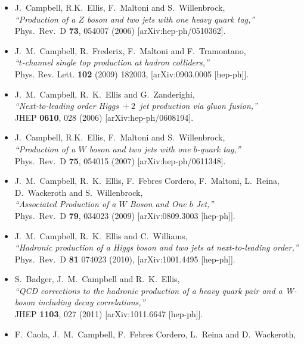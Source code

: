 \documentclass[12pt]{article}
\begin{document}
\begin{itemize}
{  decay,''} \\
  Nucl.\ Phys.\ B {\bf 726}, 109 (2005)
  [arXiv:hep-ph/0506289].
\item J.~Campbell, R.K.~Ellis, F.~Maltoni and S.~Willenbrock, \\
  {\it ``Production of a $Z$ boson and two jets with one heavy quark tag,''} \\
  Phys.\ Rev.\ D {\bf 73}, 054007 (2006)
  [arXiv:hep-ph/0510362].
\item J.~M.~Campbell, R.~Frederix, F.~Maltoni and F.~Tramontano,\\
  {\it ``$t$-channel single top production at hadron colliders,''} \\ 
  Phys. Rev. Lett. {\bf 102} (2009) 182003,
  [arXiv:0903.0005 [hep-ph]].
\item J.~M.~Campbell, R.~K.~Ellis and G.~Zanderighi, \\
  {\it ``Next-to-leading order Higgs~$+~2$~jet production via gluon fusion,''} \\
  JHEP {\bf 0610}, 028 (2006)
  [arXiv:hep-ph/0608194].
\item J.~Campbell, R.K.~Ellis, F.~Maltoni and S.~Willenbrock, \\
  {\it ``Production of a $W$ boson and two jets with one $b$-quark
  tag,''} \\
  Phys.\ Rev.\ D {\bf 75}, 054015 (2007)
  [arXiv:hep-ph/0611348].
\item J.~M.~Campbell, R.~K.~Ellis, F.~Febres Cordero, F.~Maltoni, L.~Reina, D.~Wackeroth and S.~Willenbrock, \\
  {\it ``Associated Production of a $W$ Boson and One $b$ Jet,''} \\
  Phys.\ Rev.\  D {\bf 79}, 034023 (2009)
  [arXiv:0809.3003 [hep-ph]].
\item J.~M.~Campbell, R.~K.~Ellis and C.~Williams, \\
  {\it ``Hadronic production of a Higgs boson and two jets at next-to-leading order,''} \\
   Phys.\ Rev.\ D {\bf 81} 074023 (2010),
  [arXiv:1001.4495 [hep-ph]].
\item S.~Badger, J.~M.~Campbell and R.~K.~Ellis, \\
  {\it ``QCD corrections to the hadronic production of a heavy quark pair and a  W-boson including decay correlations,''} \\
 JHEP {\bf 1103}, 027 (2011)
  [arXiv:1011.6647 [hep-ph]].
\item F.~Caola, J.~M.~Campbell, F.~Febres Cordero, L.~Reina and D.~Wackeroth, \\

\end{itemize}
\end{document}

